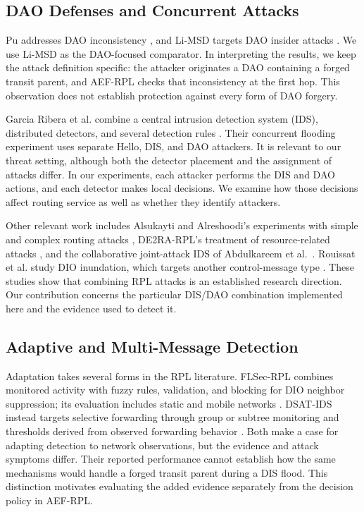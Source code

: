 \documentclass[journal]{IEEEtran}
\begin{document}
\subsection{DAO Defenses and Concurrent Attacks}
Pu addresses DAO inconsistency \cite{pu2018}, and Li-MSD targets DAO insider attacks \cite{limsd2024}. We use Li-MSD as the DAO-focused comparator. In interpreting the results, we keep the attack definition specific: the attacker originates a DAO containing a forged transit parent, and AEF-RPL checks that inconsistency at the first hop. This observation does not establish protection against every form of DAO forgery.

Garcia Ribera et al. combine a central intrusion detection system (IDS), distributed detectors, and several detection rules \cite{garciaribera2022}. Their concurrent flooding experiment uses separate Hello, DIS, and DAO attackers. It is relevant to our threat setting, although both the detector placement and the assignment of attacks differ. In our experiments, each attacker performs the DIS and DAO actions, and each detector makes local decisions. We examine how those decisions affect routing service as well as whether they identify attackers.

Other relevant work includes Alsukayti and Alreshoodi's experiments with simple and complex routing attacks \cite{alsukayti2023}, DE2RA-RPL's treatment of resource-related attacks \cite{de2rarpl2024}, and the collaborative joint-attack IDS of Abdulkareem et al.\ \cite{abdulkareem2024}. Rouissat et al. study DIO inundation, which targets another control-message type \cite{rouissat2023}. These studies show that combining RPL attacks is an established research direction. Our contribution concerns the particular DIS/DAO combination implemented here and the evidence used to detect it.

\subsection{Adaptive and Multi-Message Detection}
Adaptation takes several forms in the RPL literature. FLSec-RPL combines monitored activity with fuzzy rules, validation, and blocking for DIO neighbor suppression; its evaluation includes static and mobile networks \cite{flsecrpl2024}. DSAT-IDS instead targets selective forwarding through group or subtree monitoring and thresholds derived from observed forwarding behavior \cite{dsatids2024}. Both make a case for adapting detection to network observations, but the evidence and attack symptoms differ. Their reported performance cannot establish how the same mechanisms would handle a forged transit parent during a DIS flood. This distinction motivates evaluating the added evidence separately from the decision policy in AEF-RPL.
\end{document}

